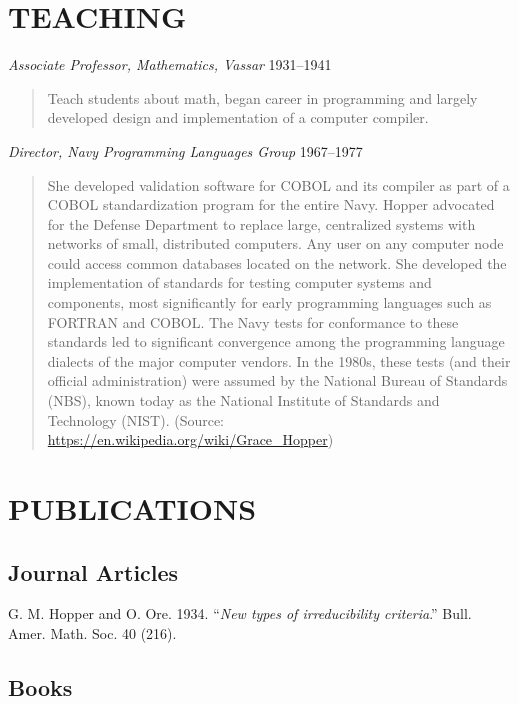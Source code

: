 \documentclass[10pt,]{article}
\begin{document}
\hypertarget{teaching}{%
\section{TEACHING}\label{teaching}}

\emph{Associate Professor, Mathematics, Vassar} \hfill 1931--1941

\begin{quote}
Teach students about math, began career in programming and largely
developed design and implementation of a computer compiler.
\end{quote}

\emph{Director, Navy Programming Languages Group} \hfill 1967--1977

\begin{quote}
She developed validation software for COBOL and its compiler as part of
a COBOL standardization program for the entire Navy. Hopper advocated
for the Defense Department to replace large, centralized systems with
networks of small, distributed computers. Any user on any computer node
could access common databases located on the network. She developed the
implementation of standards for testing computer systems and components,
most significantly for early programming languages such as FORTRAN and
COBOL. The Navy tests for conformance to these standards led to
significant convergence among the programming language dialects of the
major computer vendors. In the 1980s, these tests (and their official
administration) were assumed by the National Bureau of Standards (NBS),
known today as the National Institute of Standards and Technology
(NIST). (Source: \url{https://en.wikipedia.org/wiki/Grace_Hopper})
\end{quote}

\hypertarget{publications-1}{%
\section{PUBLICATIONS}\label{publications-1}}

\hypertarget{journal-articles-1}{%
\subsection{\texorpdfstring{\textbf{Journal
Articles}}{Journal Articles}}\label{journal-articles-1}}

G. M. Hopper and O. Ore. 1934. ``\emph{New types of irreducibility
criteria}.'' Bull. Amer. Math. Soc. 40 (216).

\hypertarget{books}{%
\subsection{\texorpdfstring{\textbf{Books}}{Books}}\label{books}}
\end{document}
